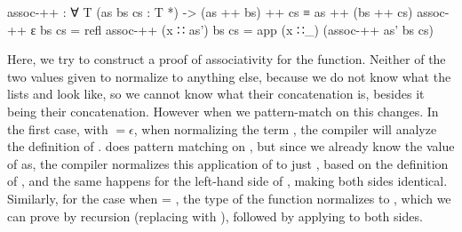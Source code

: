 		\begin{code}
			assoc-++ : ∀ {T} (as bs cs : T *) -> (as ++ bs) ++ cs ≡ as ++ (bs ++ cs)
			assoc-++ ε bs cs = refl
			assoc-++ (x ∷ as') bs cs = app (x ∷_) (assoc-++ as' bs cs)
		\end{code}

	 	Here, we try to construct a proof of associativity for the
	 	\codett{\_++\_} function. Neither of the two values given to
	 	 normalize to anything else, because we do not know what
	 	the lists  and  look like, so we cannot know
	 	what their concatenation is, besides it being their concatenation.
	 	However when we pattern-match on  this changes. In the first
	 	case, with $=\epsilon$, when normalizing the term , the compiler will analyze the definition of
	 	\codett{\_++\_}. \codett{\_++\_} does pattern matching on ,
	 	but since we already know the value of as, the compiler normalizes this
	 	application of \codett{\_++\_} to just , based on the
	 	definition of \codett{\_++\_}, and the same happens for the left-hand
	 	side of , making both sides identical.  Similarly, for
	 	the case when  = , the type of the function
	 	normalizes to , which we can prove by recursion (replacing  with
	 	), followed by applying  to both sides.
